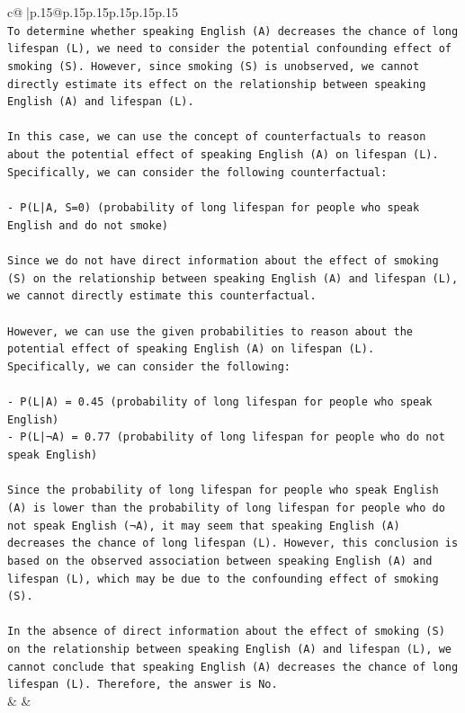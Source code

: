 \documentclass{article}
\begin{document}
{\begin{supertabular}{c@{$\;$}|p{.15\linewidth}@{}p{.15\linewidth}p{.15\linewidth}p{.15\linewidth}p{.15\linewidth}p{.15\linewidth}}
{{{\\ 
\texttt{To determine whether speaking English (A) decreases the chance of long lifespan (L), we need to consider the potential confounding effect of smoking (S). However, since smoking (S) is unobserved, we cannot directly estimate its effect on the relationship between speaking English (A) and lifespan (L).} \\
\\ 
\texttt{In this case, we can use the concept of counterfactuals to reason about the potential effect of speaking English (A) on lifespan (L). Specifically, we can consider the following counterfactual:} \\
\\ 
\texttt{{-} P(L|A, S=0) (probability of long lifespan for people who speak English and do not smoke)} \\
\\ 
\texttt{Since we do not have direct information about the effect of smoking (S) on the relationship between speaking English (A) and lifespan (L), we cannot directly estimate this counterfactual.} \\
\\ 
\texttt{However, we can use the given probabilities to reason about the potential effect of speaking English (A) on lifespan (L). Specifically, we can consider the following:} \\
\\ 
\texttt{{-} P(L|A) = 0.45 (probability of long lifespan for people who speak English)} \\
\texttt{{-} P(L|¬A) = 0.77 (probability of long lifespan for people who do not speak English)} \\
\\ 
\texttt{Since the probability of long lifespan for people who speak English (A) is lower than the probability of long lifespan for people who do not speak English (¬A), it may seem that speaking English (A) decreases the chance of long lifespan (L). However, this conclusion is based on the observed association between speaking English (A) and lifespan (L), which may be due to the confounding effect of smoking (S).} \\
\\ 
\texttt{In the absence of direct information about the effect of smoking (S) on the relationship between speaking English (A) and lifespan (L), we cannot conclude that speaking English (A) decreases the chance of long lifespan (L). Therefore, the answer is No.} \\
            }
        }
    }
    & & \\ \\


\end{supertabular}}
\end{document}
